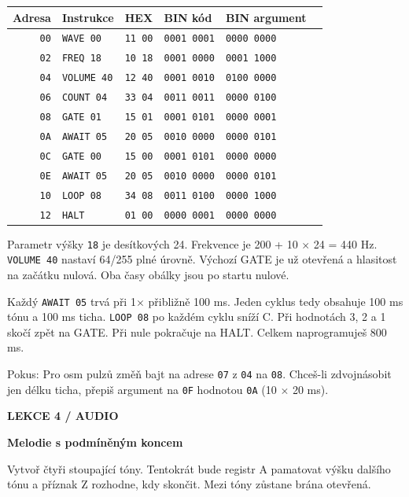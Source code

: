 \documentclass[11pt,a4paper]{article}
\newcommand{\tagline}[1]{{\sffamily\bfseries\color{accent}\small #1}\par}
\newcommand{\titleline}[1]{{\sffamily\bfseries\fontsize{25}{29}\selectfont #1\par}\vspace{2mm}}
\newcommand{\sub}[1]{\par\vspace{2mm}{\sffamily\bfseries\large #1\par}\nobreak}
\newcommand{\note}[1]{\par\vspace{2mm}\noindent\colorbox{pale}{\parbox{.96\linewidth}{\raggedright #1}}\par}
\begin{document}
{\small\begin{tabularx}{\linewidth}{@{}rllllX@{}}\toprule
\textbf{Adresa} & \textbf{Instrukce} & \textbf{HEX} & \textbf{BIN kód} & \textbf{BIN argument} & \textbf{}\\\midrule
\texttt{00} & \texttt{WAVE 00} & \texttt{11 00} & \texttt{0001 0001} & \texttt{0000 0000} & \\
\texttt{02} & \texttt{FREQ 18} & \texttt{10 18} & \texttt{0001 0000} & \texttt{0001 1000} & \\
\texttt{04} & \texttt{VOLUME 40} & \texttt{12 40} & \texttt{0001 0010} & \texttt{0100 0000} & \\
\texttt{06} & \texttt{COUNT 04} & \texttt{33 04} & \texttt{0011 0011} & \texttt{0000 0100} & \\
\texttt{08} & \texttt{GATE 01} & \texttt{15 01} & \texttt{0001 0101} & \texttt{0000 0001} & \\
\texttt{0A} & \texttt{AWAIT 05} & \texttt{20 05} & \texttt{0010 0000} & \texttt{0000 0101} & \\
\texttt{0C} & \texttt{GATE 00} & \texttt{15 00} & \texttt{0001 0101} & \texttt{0000 0000} & \\
\texttt{0E} & \texttt{AWAIT 05} & \texttt{20 05} & \texttt{0010 0000} & \texttt{0000 0101} & \\
\texttt{10} & \texttt{LOOP 08} & \texttt{34 08} & \texttt{0011 0100} & \texttt{0000 1000} & \\
\texttt{12} & \texttt{HALT} & \texttt{01 00} & \texttt{0000 0001} & \texttt{0000 0000} & \\
\bottomrule\end{tabularx}}\par
\sub{Proč právě 18 a 05?}
Parametr výšky \texttt{18} je desítkových 24. Frekvence je 200 + 10 \ensuremath{\times} 24 = 440 Hz. \texttt{VOLUME 40} nastaví 64/255 plné úrovně. Výchozí GATE je už otevřená a hlasitost na začátku nulová. Oba časy obálky jsou po startu nulové.

Každý \texttt{AWAIT 05} trvá při 1\ensuremath{\times} přibližně 100 ms. Jeden cyklus tedy obsahuje 100 ms tónu a 100 ms ticha. \texttt{LOOP 08} po každém cyklu sníží C. Při hodnotách 3, 2 a 1 skočí zpět na GATE. Při nule pokračuje na HALT. Celkem naprogramuješ 800 ms.

\note{Pokus: Pro osm pulzů změň bajt na adrese \texttt{07} z \texttt{04} na \texttt{08}. Chceš-li zdvojnásobit jen délku ticha, přepiš argument na \texttt{0F} hodnotou \texttt{0A} (10 \ensuremath{\times} 20 ms).}
\clearpage
\tagline{LEKCE 4  /  AUDIO}
\titleline{Melodie s podmíněným koncem}
Vytvoř čtyři stoupající tóny. Tentokrát bude registr A pamatovat výšku dalšího tónu a příznak Z rozhodne, kdy skončit. Mezi tóny zůstane brána otevřená.
\end{document}
